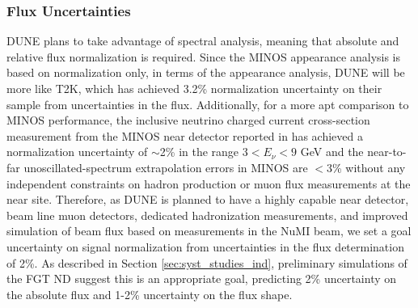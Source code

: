 \subsubsection{Flux Uncertainties}
\label{sec:syst_just_flux}
DUNE plans to take advantage of spectral analysis,
meaning that absolute and relative flux normalization is required. Since the MINOS \nue appearance analysis
is based on normalization only, in terms of the \nue appearance analysis, DUNE will be more like T2K,
which has achieved 3.2\% normalization uncertainty on their \nue sample from uncertainties in the flux.
Additionally, for a more apt
comparison to MINOS performance, the inclusive neutrino charged current cross-section measurement from the MINOS
near detector reported in \cite{Adamson:2009ju} has achieved a normalization uncertainty of $\sim$2\% in the
range $3 < E_\nu < 9$ GeV and the near-to-far \numu unoscillated-spectrum extrapolation errors in MINOS
are $<$3\% without any independent constraints on hadron production or muon flux measurements at the near
site. Therefore, as DUNE is planned to have a highly capable near detector, beam line
muon detectors, dedicated hadronization measurements, and improved simulation of beam flux based on \minerva
measurements in the NuMI beam, we set a goal uncertainty on \nue signal
normalization from uncertainties in the flux determination of 2\%.
As described in Section \ref{sec:syst_studies_ind}, preliminary simulations of the FGT ND suggest this
is an appropriate goal, predicting 2\% uncertainty on the absolute flux and 1-2\% uncertainty on
the flux shape.

